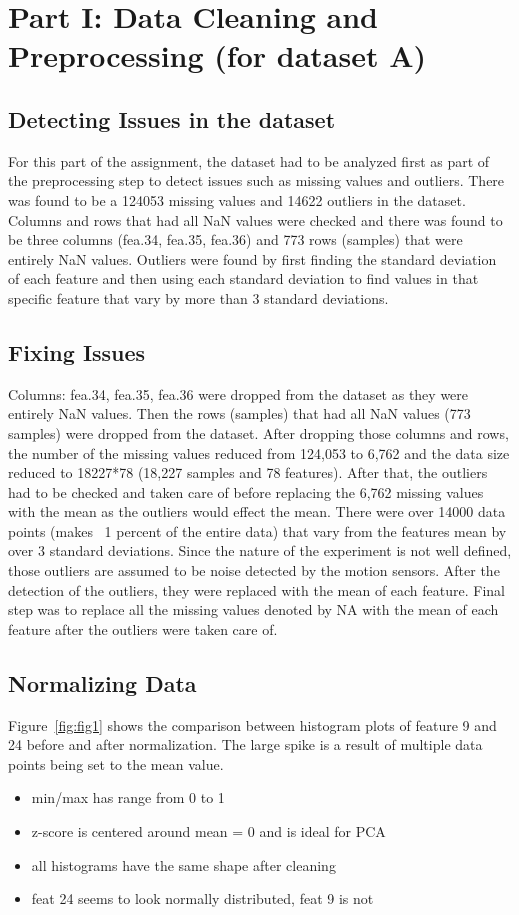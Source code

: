 \section{Part I: Data Cleaning and Preprocessing (for dataset A)}
\subsection{Detecting Issues in the dataset}
For this part of the assignment, the dataset had to be analyzed first as part of the preprocessing step to detect issues such as missing values and outliers. There was found to be a 124053 missing values and 14622 outliers in the dataset. Columns and rows that had all NaN values were checked and there was found to be three columns (fea.34, fea.35, fea.36) and 773 rows (samples) that were entirely NaN values.
Outliers were found by first finding the standard deviation of each feature and then using each standard deviation to find values in that specific feature that vary by more than 3 standard deviations. 

\subsection{Fixing Issues}
Columns: fea.34, fea.35, fea.36 were dropped from the dataset as they were entirely NaN values. Then the rows (samples) that had all NaN values (773 samples) were dropped from the dataset. After dropping those columns and rows, the number of the missing values reduced from 124,053 to 6,762 and the data size reduced to 18227*78 (18,227 samples and 78 features). 
After that, the outliers had to be checked and taken care of before replacing the 6,762 missing values with the mean as the outliers would effect the mean. There were over 14000 data points (makes ~1 percent of the entire data) that vary from the features mean by over 3 standard deviations. Since the nature of the experiment is not well defined, those outliers are assumed to be noise detected by the motion sensors. After the detection of the outliers, they were replaced with the mean of each feature. Final step was to replace all the missing values denoted by NA with the mean of each feature after the outliers were taken care of. 

\subsection{Normalizing Data}
Figure~\ref{fig:fig1} shows the comparison between histogram plots of feature 9 and 24 before and after normalization. The large spike is a result of multiple data points being set to the mean value.
\begin{itemize}
\item min/max has range from 0 to 1
\item z-score is centered around mean = 0 and is ideal for PCA
\item all histograms have the same shape after cleaning
\item feat 24 seems to look normally distributed, feat 9 is not
\end{itemize}


